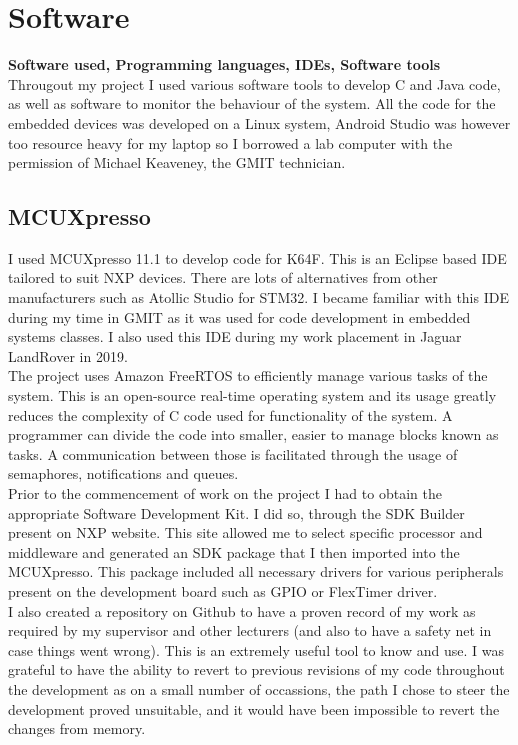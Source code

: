 \documentclass[12pt,a4paper]{article}
\begin{document}
	\section{Software}
	{\bfseries Software used, Programming languages, IDEs, Software tools}\\
	
	Througout my project I used various software tools to develop C and Java code, as well as software to monitor the behaviour of the system. All the code for the embedded devices was developed on a Linux system, Android Studio was however too resource heavy for my laptop so I borrowed a lab computer with the permission of Michael Keaveney, the GMIT technician.
	
		\subsection{MCUXpresso}
		
		I used MCUXpresso 11.1 to develop code for K64F. This is an Eclipse based IDE tailored to suit NXP devices. There are lots of alternatives from other manufacturers such as Atollic Studio for STM32. I became familiar with this IDE during my time in GMIT as it was used for code development in embedded systems classes. I also used this IDE during my work placement in Jaguar LandRover in 2019.\\
		
		The project uses Amazon FreeRTOS to efficiently manage various tasks of the system. This is an open-source real-time operating system and its usage greatly reduces the complexity of C code used for functionality of the system. A programmer can divide the code into smaller, easier to manage blocks known as tasks. A communication between those is facilitated through the usage of semaphores, notifications and queues.\\
		
		Prior to the commencement of work on the project I had to obtain the appropriate Software Development Kit. I did so, through the SDK Builder present on NXP website. This site allowed me to select specific processor and middleware and generated an SDK package that I then imported into the MCUXpresso. This package included all necessary drivers for various peripherals present on the development board such as GPIO or FlexTimer driver.\\
		
		I also created a repository on Github to have a proven record of my work as required by my supervisor and other lecturers (and also to have a safety net in case things went wrong). This is an extremely useful tool to know and use. I was grateful to have the ability to revert to previous revisions of my code throughout the development as on a small number of occassions, the path I chose to steer the development proved unsuitable, and it would have been impossible to revert the changes from memory.
		\newpage
	
\end{document}
